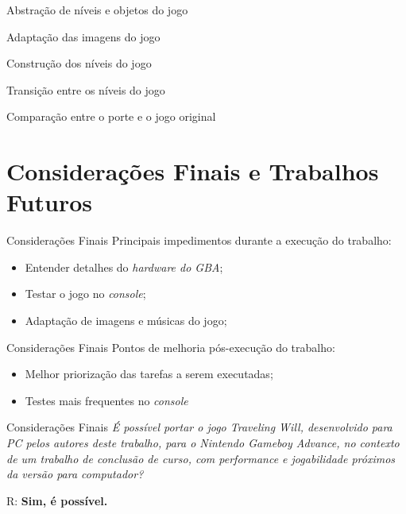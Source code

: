 \documentclass[notes, mathserif]{beamer}
\begin{document}
\begin{frame}{Abstra\c c\~ao de n\'iveis e objetos do jogo}
\end{frame}

\begin{frame}{Adapta\c c\~ao das imagens do jogo}
\end{frame}

\begin{frame}{Constru\c c\~ao dos n\'iveis do jogo}
\end{frame}

\begin{frame}{Transi\c c\~ao entre os n\'iveis do jogo}
\end{frame}

\begin{frame}{Compara\c c\~ao entre o porte e o jogo original}
\end{frame}

\section{Considera\c c\~oes Finais e Trabalhos Futuros}

\begin{frame}{Considera\c c\~oes Finais}
	Principais impedimentos durante a execu\c c\~ao do trabalho:
	\begin{itemize}[<+->]
		\item Entender detalhes do \textit{hardware do GBA};
		\item Testar o jogo no \textit{console};
		\item Adapta\c c\~ao de imagens e m\'usicas do jogo;
	\end{itemize}
\end{frame}

\begin{frame}{Considera\c c\~oes Finais}
	Pontos de melhoria p\'os-execu\c c\~ao do trabalho:
	\begin{itemize}[<+->]
		\item Melhor prioriza\c c\~ao das tarefas a serem executadas;
		\item Testes mais frequentes no \textit{console}
	\end{itemize}
\end{frame}

\begin{frame}{Considera\c c\~oes Finais}
	\textit{\'E poss\'ivel portar o jogo Traveling Will,
desenvolvido para PC pelos autores deste trabalho, para o Nintendo Gameboy Advance, no
contexto de um trabalho de conclus\~ao de curso, com performance e jogabilidade pr\'oximos
da vers\~ao para computador?}
\par
R: \textbf{Sim, \'e poss\'ivel.}
\end{frame}
\end{document}
